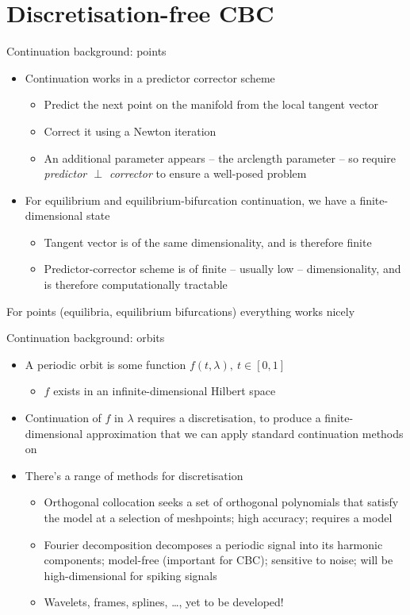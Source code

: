 \documentclass[presentation]{beamer}
\begin{document}
\section{Discretisation-free CBC}
\label{sec:org40faab0}
\begin{frame}[label={sec:org95abb1d}]{Continuation background: points}
\begin{itemize}
\item Continuation works in a predictor corrector scheme
\begin{itemize}
\item Predict the next point on the manifold from the local tangent vector
\item Correct it using a Newton iteration
\item An additional parameter appears -- the arclength parameter -- so require \emph{predictor \(\perp\) corrector} to ensure a well-posed problem
\end{itemize}
\item For equilibrium and equilibrium-bifurcation continuation, we have a finite-dimensional state
\begin{itemize}
\item Tangent vector is of the same dimensionality, and is therefore finite
\item Predictor-corrector scheme is of finite -- usually low -- dimensionality, and is therefore computationally tractable
\end{itemize}
\end{itemize}

For points (equilibria, equilibrium bifurcations) everything works nicely
\end{frame}

\begin{frame}[label={sec:org6412ecc}]{Continuation background: orbits}
\begin{itemize}
\item A periodic orbit is some function \(f(t,\lambda),~t\in[0,1]\)
\begin{itemize}
\item \(f\) exists in an infinite-dimensional Hilbert space
\end{itemize}
\item Continuation of \(f\) in \(\lambda\) requires a discretisation, to produce a finite-dimensional approximation that we can apply standard continuation methods on
\item There's a range of methods for discretisation
\begin{itemize}
\item Orthogonal collocation seeks a set of orthogonal polynomials that satisfy the model at a selection of meshpoints; high accuracy; requires a model
\item Fourier decomposition decomposes a periodic signal into its harmonic components; model-free (important for CBC); sensitive to noise; will be high-dimensional for spiking signals
\item Wavelets, frames, splines, \dots{}, yet to be developed!
\end{itemize}
\end{itemize}
\end{frame}
\end{document}
